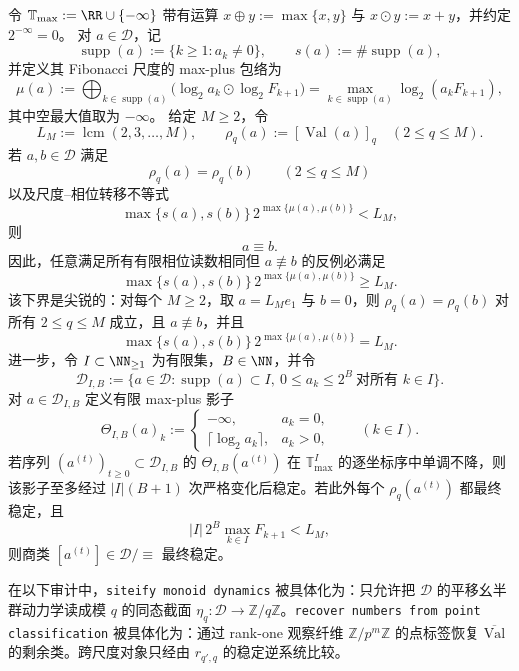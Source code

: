 \begin{theorem}\label{distill:connes_consani_arithmetic_site-characteristic_one_stable_value_reconstruction-max-plus-envelope-phase-descent}
令
\(
\mathbb T_{\max}:=\RR\cup\{-\infty\}
\)
带有运算
\(
x\oplus y:=\max\{x,y\}
\)
与
\(
x\odot y:=x+y
\)，并约定 \(2^{-\infty}=0\)。
对 \(a\in\mathcal D\)，记
\[
\operatorname{supp}(a):=\{k\ge1:a_k\ne0\},
\qquad
s(a):=\#\operatorname{supp}(a),
\]
并定义其 Fibonacci 尺度的 max-plus 包络为
\[
\mu(a):=\bigoplus_{k\in\operatorname{supp}(a)}
\bigl(\log_2 a_k\odot\log_2 F_{k+1}\bigr)
=\max_{k\in\operatorname{supp}(a)}\log_2(a_kF_{k+1}),
\]
其中空最大值取为 \(-\infty\)。
给定 \(M\ge2\)，令
\[
L_M:=\operatorname{lcm}(2,3,\ldots,M),
\qquad
\rho_q(a):=[\operatorname{Val}(a)]_q\quad(2\le q\le M).
\]
若 \(a,b\in\mathcal D\) 满足
\[
\rho_q(a)=\rho_q(b)\qquad(2\le q\le M)
\]
以及尺度--相位转移不等式
\[
\max\{s(a),s(b)\}\,2^{\max\{\mu(a),\mu(b)\}}<L_M,
\]
则
\[
a\equiv b.
\]
因此，任意满足所有有限相位读数相同但 \(a\not\equiv b\) 的反例必满足
\[
\max\{s(a),s(b)\}\,2^{\max\{\mu(a),\mu(b)\}}\ge L_M.
\]
该下界是尖锐的：对每个 \(M\ge2\)，取
\(
a=L_Me_1
\)
与
\(
b=0
\)，则 \(\rho_q(a)=\rho_q(b)\) 对所有 \(2\le q\le M\) 成立，且 \(a\not\equiv b\)，并且
\[
\max\{s(a),s(b)\}\,2^{\max\{\mu(a),\mu(b)\}}=L_M.
\]
进一步，令 \(I\subset\NN_{\ge1}\) 为有限集，\(B\in\NN\)，并令
\[
\mathcal D_{I,B}:=\{a\in\mathcal D:\operatorname{supp}(a)\subset I,\ 0\le a_k\le 2^B\ \text{对所有 }k\in I\}.
\]
对 \(a\in\mathcal D_{I,B}\) 定义有限 max-plus 影子
\[
\Theta_{I,B}(a)_k:=
\begin{cases}
-\infty,&a_k=0,\\
\lceil\log_2 a_k\rceil,&a_k>0,
\end{cases}
\qquad(k\in I).
\]
若序列 \((a^{(t)})_{t\ge0}\subset\mathcal D_{I,B}\) 的 \(\Theta_{I,B}(a^{(t)})\) 在 \(\mathbb T_{\max}^{I}\) 的逐坐标序中单调不降，则该影子至多经过 \(|I|(B+1)\) 次严格变化后稳定。若此外每个 \(\rho_q(a^{(t)})\) 都最终稳定，且
\[
|I|\,2^B\max_{k\in I}F_{k+1}<L_M,
\]
则商类 \([a^{(t)}]\in\mathcal D/\!\equiv\) 最终稳定。
\end{theorem}
\begin{remark}[方法算子的有限翻译]\label{distill:connes_consani_arithmetic_site-point_spectrum_obstruction_classification-operator-bridge}
在以下审计中，\texttt{siteify monoid dynamics} 被具体化为：只允许把 \(\mathcal D\) 的平移幺半群动力学读成模 \(q\) 的同态截面 \(\eta_q:\mathcal D\to\mathbb Z/q\mathbb Z\)。\texttt{recover numbers from point classification} 被具体化为：通过 rank-one 观察纤维 \(\mathbb Z/p^m\mathbb Z\) 的点标签恢复 \(\overline{\mathrm{Val}}\) 的剩余类。跨尺度对象只经由 \(r_{q',q}\) 的稳定逆系统比较。
\end{remark}

